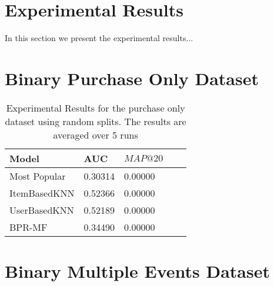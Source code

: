 \section{Experimental Results}

In this section we present the experimental results...



\section{Binary Purchase Only Dataset}

\begin{table}
    \centering
    \begin{tabular}{*{5}l}
    \toprule
    Model 			&	AUC			&	$MAP@20$ \\ \midrule
    Most Popular	&	0.30314		&	0.00000	\\
    ItemBasedKNN	&	0.52366		&	0.00000	\\
    UserBasedKNN	&	0.52189		&	0.00000	\\
    BPR-MF			&	0.34490		&	0.00000	\\
    \bottomrule
    \end{tabular}
\caption[Experimental Results - Purchase Only Dataset]{Experimental Results for the purchase only dataset using random splits. The results are averaged over 5 runs}
\end{table}


\section{Binary Multiple Events Dataset}



\begin{table}
    \centering
\caption{Experimental Results - Purchase Only Dataset}
\end{table}




